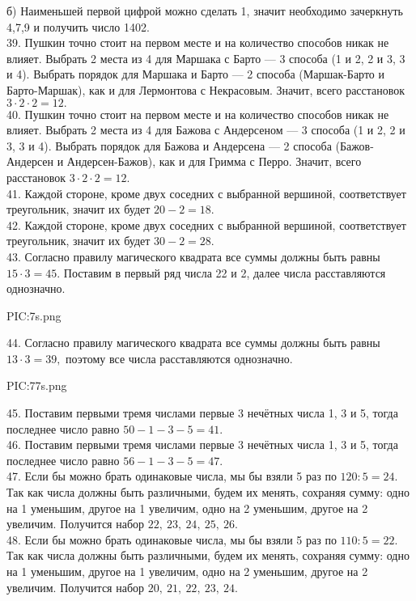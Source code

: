 б) Наименьшей первой цифрой можно сделать 1, значит необходимо зачеркнуть 4,7,9 и получить число 1402.\\
39. Пушкин точно стоит на первом месте и на количество способов никак не влияет. Выбрать 2 места из 4 для Маршака с Барто --- 3 способа (1 и 2, 2 и 3, 3 и 4). Выбрать порядок для Маршака и Барто --- 2 способа (Маршак-Барто и Барто-Маршак), как и для  Лермонтова с Некрасовым. Значит, всего расстановок $3\cdot2\cdot2=12.$\\
40. Пушкин точно стоит на первом месте и на количество способов никак не влияет. Выбрать 2 места из 4 для Бажова с Андерсеном --- 3 способа (1 и 2, 2 и 3, 3 и 4). Выбрать порядок для Бажова и Андерсена --- 2 способа (Бажов-Андерсен и Андерсен-Бажов), как и для  Гримма с Перро. Значит, всего расстановок $3\cdot2\cdot2=12.$\\
41. Каждой стороне, кроме двух соседних с выбранной вершиной, соответствует треугольник, значит их будет $20-2=18.$\\
42. Каждой стороне, кроме двух соседних с выбранной вершиной, соответствует треугольник, значит их будет $30-2=28.$\\
43. Согласно правилу магического квадрата все суммы должны быть равны $15\cdot3=45.$ Поставим в первый ряд числа 22 и 2, далее числа расставляются однозначно.
\begin{center}
{{PIC:7s.png}}
\end{center}
44. Согласно правилу магического квадрата все суммы должны быть равны $13\cdot3=39,$ поэтому все числа расставляются однозначно.
\begin{center}
{{PIC:77s.png}}
\end{center}
45. Поставим первыми тремя числами первые 3 нечётных числа 1, 3 и 5, тогда последнее число равно $50-1-3-5=41.$\\
46. Поставим первыми тремя числами первые 3 нечётных числа 1, 3 и 5, тогда последнее число равно $56-1-3-5=47.$\\
47. Если бы можно брать одинаковые числа, мы бы взяли 5 раз по $120:5=24.$ Так как числа должны быть различными, будем их менять, сохраняя сумму: одно на 1 уменьшим, другое на 1 увеличим, одно на 2 уменьшим, другое на 2 увеличим. Получится набор $22,\ 23,\ 24,\ 25,\ 26.$\\
48. Если бы можно брать одинаковые числа, мы бы взяли 5 раз по $110:5=22.$ Так как числа должны быть различными, будем их менять, сохраняя сумму: одно на 1 уменьшим, другое на 1 увеличим, одно на 2 уменьшим, другое на 2 увеличим. Получится набор $20,\ 21,\ 22,\ 23,\ 24.$\\
